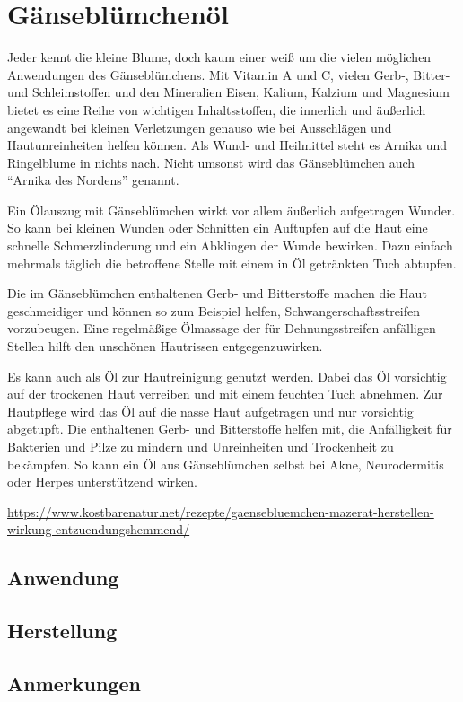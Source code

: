 \section{Gänseblümchenöl}


Jeder kennt die kleine Blume, doch kaum einer weiß um die vielen möglichen Anwendungen des Gänseblümchens. Mit Vitamin A und C, vielen Gerb-, Bitter- und Schleimstoffen und den Mineralien Eisen, Kalium, Kalzium und Magnesium bietet es eine Reihe von wichtigen Inhaltsstoffen, die innerlich und äußerlich angewandt bei kleinen Verletzungen genauso wie bei Ausschlägen und Hautunreinheiten helfen können. Als Wund- und Heilmittel steht es Arnika und Ringelblume in nichts nach. Nicht umsonst wird das Gänseblümchen auch “Arnika des Nordens” genannt.

Ein Ölauszug mit Gänseblümchen wirkt vor allem äußerlich aufgetragen Wunder. So kann bei kleinen Wunden oder Schnitten ein Auftupfen auf die Haut eine schnelle Schmerzlinderung und ein Abklingen der Wunde bewirken. Dazu einfach mehrmals täglich die betroffene Stelle mit einem in Öl getränkten Tuch abtupfen.

Die im Gänseblümchen enthaltenen Gerb- und Bitterstoffe machen die Haut geschmeidiger und können so zum Beispiel helfen, Schwangerschaftsstreifen vorzubeugen. Eine regelmäßige Ölmassage der für Dehnungsstreifen anfälligen Stellen hilft den unschönen Hautrissen entgegenzuwirken.

Es kann auch als Öl zur Hautreinigung genutzt werden. Dabei das Öl vorsichtig auf der trockenen Haut verreiben und mit einem feuchten Tuch abnehmen. Zur Hautpflege wird das Öl auf die nasse Haut aufgetragen und nur vorsichtig abgetupft. Die enthaltenen Gerb- und Bitterstoffe helfen mit, die Anfälligkeit für Bakterien und Pilze zu mindern und Unreinheiten und Trockenheit zu bekämpfen. So kann ein Öl aus Gänseblümchen selbst bei Akne, Neurodermitis oder Herpes unterstützend wirken.

\url{https://www.kostbarenatur.net/rezepte/gaensebluemchen-mazerat-herstellen-wirkung-entzuendungshemmend/}

\subsection{Anwendung}
\subsection{Herstellung}
\subsection{Anmerkungen}



